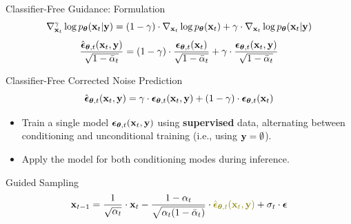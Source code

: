 \documentclass{beamer}
\begin{document}
\begin{frame}{Classifier-Free Guidance: Formulation}
	\[
		\nabla_{\mathbf{x}_t}^{\gamma} \log p_{\boldsymbol{\theta}}(\mathbf{x}_t | \mathbf{y}) =  (1 - \gamma) \cdot  \nabla_{\mathbf{x}_t} \log p_{\boldsymbol{\theta}}(\mathbf{x}_t) + \gamma \cdot  \nabla_{\mathbf{x}_t} \log p_{\boldsymbol{\theta}}(\mathbf{x}_t| \mathbf{y})
	\]
	\eqpause
	\[
		\frac{\hat{\boldsymbol{\epsilon}}_{\boldsymbol{\theta}, t}(\mathbf{x}_t, \mathbf{y})}{\sqrt{1 - \bar{\alpha}_t}} = (1 - \gamma) \cdot  \frac{\boldsymbol{\epsilon}_{\boldsymbol{\theta}, t}(\mathbf{x}_t)}{\sqrt{1 - \bar{\alpha}_t}} +  \gamma \cdot \frac{\boldsymbol{\epsilon}_{\boldsymbol{\theta}, t}(\mathbf{x}_t, \mathbf{y})}{\sqrt{1 - \bar{\alpha}_t}} 
	\]
	\eqpause
	\begin{block}{Classifier-Free Corrected Noise Prediction}
		\vspace{-0.3cm}
		\[
			\hat{\boldsymbol{\epsilon}}_{\boldsymbol{\theta}, t}(\mathbf{x}_t, \mathbf{y}) = \gamma \cdot \boldsymbol{\epsilon}_{\boldsymbol{\theta}, t}(\mathbf{x}_t, \mathbf{y}) + (1 - \gamma) \cdot \boldsymbol{\epsilon}_{\boldsymbol{\theta}, t}(\mathbf{x}_t)
		\]
		\vspace{-0.5cm}
	\end{block}
	\eqpause
	\begin{itemize}
		\item Train a single model $\boldsymbol{\epsilon}_{\boldsymbol{\theta}, t}(\mathbf{x}_t, \mathbf{y})$ using \textbf{supervised} data, alternating between conditioning and unconditional training (i.e., using $\mathbf{y} = \emptyset$).
		\eqpause
		\item Apply the model for both conditioning modes during inference.
	\end{itemize}
	\eqpause
	\begin{block}{Guided Sampling}
		\vspace{-0.3cm}
		\[
			\bx_{t-1} = \frac{1}{\sqrt{\alpha_t}} \cdot \bx_t - \frac{1 - \alpha_t}{\sqrt{\alpha_t (1 - \bar{\alpha}_t)}} \cdot  {\color{olive}\hat{\bepsilon}_{\btheta, t}(\bx_t, \by)} + \sigma_t \cdot \bepsilon
		\]
	\end{block}
\end{frame}
\end{document}
